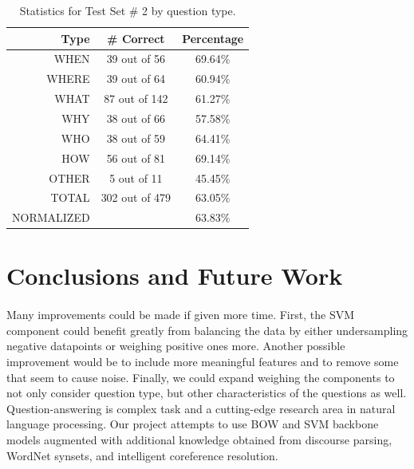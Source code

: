 \documentclass[11pt,letterpaper]{article}
\begin{document}
\begin{table}
\centering

	\begin{tabular}{|r|c|c|}
	\hline
	Type   & \# Correct & Percentage \\
	\hline
	\hline
	WHEN   &  39 out of   56 &  69.64\% \\
	\hline
	WHERE  &  39 out of   64 &  60.94\% \\
	\hline
	WHAT   &  87 out of  142 &  61.27\% \\
	\hline
	WHY    &  38 out of   66 &  57.58\% \\
	\hline
	WHO    &  38 out of   59 &  64.41\% \\
	\hline
	HOW    &  56 out of   81 &  69.14\% \\
	\hline
	OTHER  &   5 out of   11 &  45.45\% \\
	\hline
	\hline
	TOTAL  & 302 out of 479 &  63.05\% \\
	\tiny{NORMALIZED}  &  &  63.83\% \\
	\hline
	\end{tabular}

\caption{Statistics for Test Set \# 2 by question type.}
\label{table:question-types2}
\end{table}

%
%




\section{Conclusions and Future Work}
\label{sec:conclusion}
\paragraph{}
Many improvements could be made if given more time.  First, the SVM
component could benefit greatly from balancing the data by either
undersampling negative datapoints or weighing positive ones
more. Another possible improvement would be to include more meaningful
features and to remove some that seem to cause noise.  Finally, we
could expand weighing the components to not only consider question
type, but other characteristics of the questions as well.
Question-answering is complex task and a cutting-edge research area
in natural language processing. Our project attempts to use BOW and SVM backbone models augmented with additional knowledge obtained from discourse parsing, WordNet synsets, and intelligent coreference resolution. 



%
%

%
 

%
\end{document}
